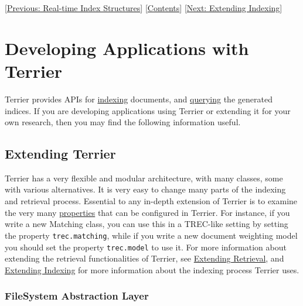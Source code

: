 {[}\href{realtime_indices.html}{Previous: Real-time Index Structures}{]}
{[}\href{index.html}{Contents}{]} {[}\href{extend_indexing.html}{Next:
Extending Indexing}{]}\\

\section{Developing Applications with
Terrier}\label{developing-applications-with-terrier}

Terrier provides APIs for \href{extend_indexing.html}{indexing}
documents, and \href{extend_retrieval.html}{querying} the generated
indices. If you are developing applications using Terrier or extending
it for your own research, then you may find the following information
useful.

\subsection{Extending Terrier}\label{extending-terrier}

Terrier has a very flexible and modular architecture, with many classes,
some with various alternatives. It is very easy to change many parts of
the indexing and retrieval process. Essential to any in-depth extension
of Terrier is to examine the very many
\href{properties.html}{properties} that can be configured in Terrier.
For instance, if you write a new Matching class, you can use this in a
TREC-like setting by setting the property \texttt{trec.matching}, while
if you write a new document weighting model you should set the property
\texttt{trec.model} to use it. For more information about extending the
retrieval functionalities of Terrier, see
\href{extend_retrieval.html}{Extending Retrieval}, and
\href{extend_indexing.html}{Extending Indexing} for more information
about the indexing process Terrier uses.

\subsubsection{FileSystem Abstraction
Layer}\label{filesystem-abstraction-layer}

